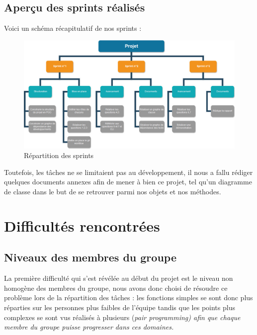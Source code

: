 \documentclass[a4paper, 12pt]{report}
\newcommand{\en}[1]{\it{#1}}
\begin{document}
    \section{Aperçu des sprints réalisés}
    
    Voici un schéma récapitulatif de nos sprints :
    \begin{figure}[h]
        \includegraphics[width=\textwidth]{resources/WBS.jpg}
        \centering
            \caption{\label{1} Répartition des sprints}
    \end{figure}
    
    Toutefois, les tâches ne se limitaient pas au développement, il nous a fallu rédiger quelques documents annexes afin de mener à bien ce projet, tel qu'un diagramme de classe dans le but de se retrouver parmi nos objets et nos méthodes.
    
    \chapter{Difficultés rencontrées} %
    
    \section{Niveaux des membres du groupe}
    
    La première difficulté qui s'est révélée au début du projet est le niveau non homogène des membres du groupe, nous avons donc choisi de résoudre ce problème lors de la répartition des tâches : les fonctions simples se sont donc plus réparties sur les personnes plus faibles de l'équipe tandis que les points plus complexes se sont vus réalisés à plusieurs (\en{pair programming}) afin que chaque membre du groupe puisse progresser dans ces domaines.
    
\end{document}
